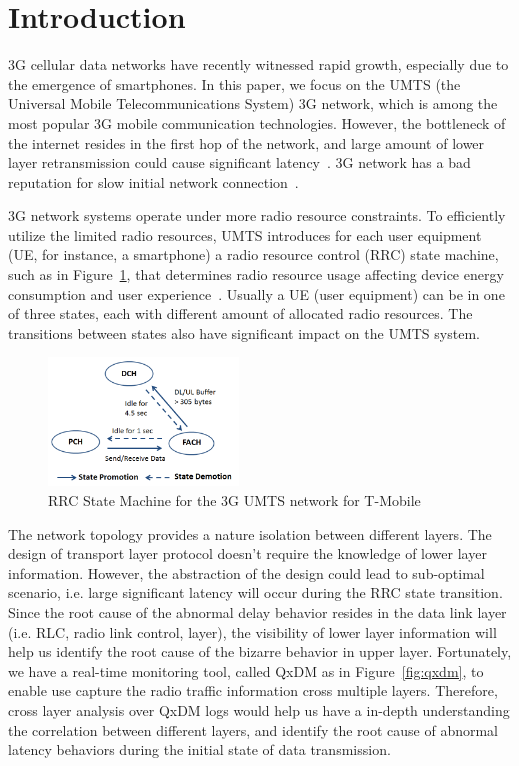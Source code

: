 \section{Introduction}


3G cellular data networks have recently witnessed rapid growth, especially due to the emergence of smartphones. In this paper, we focus on the UMTS (the Universal Mobile Telecommunications System) 3G network, which is among the most popular 3G mobile communication technologies. However, the bottleneck of the internet resides in the first hop of the network, and large amount of lower layer retransmission could cause significant latency~\cite{bufferbloat}. 3G network has a bad reputation for slow initial network connection~\cite{3g.slow}.

3G network systems operate under more radio resource constraints. To efficiently utilize the limited radio resources, UMTS introduces for each user equipment (UE, for instance, a smartphone) a radio resource control (RRC) state machine, such as in Figure~\ref{fig:rrc.state.machine}, that determines radio resource usage affecting device energy consumption and user experience~\cite{spec-3G-RRC}. Usually a UE (user equipment) can be in one of three states, each with different amount of allocated radio resources. The transitions between states also have significant impact on the UMTS system. 

\begin{figure}[h!]
\centering
\includegraphics[width=0.45\textwidth]{figs/rrc_state.png}
\caption{RRC State Machine for the 3G UMTS network for T-Mobile}
\label{fig:rrc.state.machine}
\end{figure}

The network topology provides a nature isolation between different layers. The design of transport layer protocol doesn't require the knowledge of lower layer information. However, the abstraction of the design could lead to sub-optimal scenario, i.e. large significant latency will occur during the RRC state transition. Since the root cause of the abnormal delay behavior resides in the data link layer (i.e. RLC, radio link control, layer), the visibility of lower layer information will help us identify the root cause of the bizarre behavior in upper layer. Fortunately, we have a real-time monitoring tool, called QxDM as in Figure~\ref{fig:qxdm}, to enable use capture the radio traffic information cross multiple layers. Therefore, cross layer analysis over QxDM logs would help us have a in-depth understanding the correlation between different layers, and identify the root cause of abnormal latency behaviors during the initial state of data transmission.


